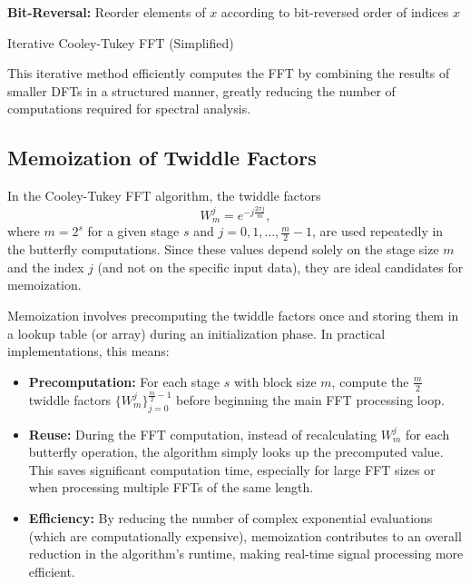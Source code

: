 \documentclass[12pt,letter]{article}
\begin{document}
\begin{algorithm}[H]
\SetAlgoLined
{}
\textbf{Bit-Reversal:} Reorder elements of \( x \) according to bit-reversed order of indices\;
\Return \( x \)\;
\caption{Iterative Cooley-Tukey FFT (Simplified)}
\label{alg:cooley-tukey}
\end{algorithm}

This iterative method efficiently computes the FFT by combining the results
of smaller DFTs in a structured manner, greatly reducing the number of
computations required for spectral analysis.

\subsection{Memoization of Twiddle Factors}

In the Cooley-Tukey FFT algorithm, the twiddle factors
\[
W_m^j = e^{-j\frac{2\pi j}{m}},
\]
where \( m = 2^s \) for a given stage \( s \) and
\( j = 0, 1, \ldots, \frac{m}{2}-1 \), are used repeatedly in the butterfly
computations. Since these values depend solely on the stage size \( m \) and
the index \( j \) (and not on the specific input data), they are ideal
candidates for memoization.

Memoization involves precomputing the twiddle factors once and storing them
in a lookup table (or array) during an initialization phase. In practical
implementations, this means:
\begin{itemize}
  \item \textbf{Precomputation:} For each stage \( s \) with block size
  \( m \), compute the \( \frac{m}{2} \) twiddle factors
  \( \{W_m^j\}_{j=0}^{\frac{m}{2}-1} \) before beginning the main FFT
  processing loop.
  \item \textbf{Reuse:} During the FFT computation, instead of recalculating
  \( W_m^j \) for each butterfly operation, the algorithm simply looks up the
  precomputed value. This saves significant computation time, especially for
  large FFT sizes or when processing multiple FFTs of the same length.
  \item \textbf{Efficiency:} By reducing the number of complex exponential
  evaluations (which are computationally expensive), memoization contributes
  to an overall reduction in the algorithm's runtime, making real-time signal
  processing more efficient.
\end{itemize}
\end{document}
